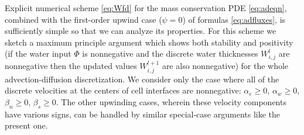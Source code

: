 \documentclass[11pt,final]{amsart}%
\newcommand{\Wlij}{W^l_{i,j}}
\begin{document}
Explicit numerical scheme \eqref{eq:Wfd} for the mass conservation PDE \eqref{eq:adeqn}, combined with the first-order upwind case ($\psi=0$) of formulas \eqref{eq:adfluxes}, is sufficiently simple so that we can analyze its properties.  For this scheme we sketch a maximum principle argument \citep{MortonMayers} which shows both stability and positivity (if the water input $\Phi$ is nonnegative and the discrete water thicknesses $\Wlij$ are nonnegative then the updated values $W_{i,j}^{l+1}$ are also nonnegative) for the whole advection-diffusion discretization.    We consider only the case where all of the discrete velocities at the centers of cell interfaces are nonnegative: $\alpha_e\ge 0$, $\alpha_w\ge 0$, $\beta_n\ge 0$, $\beta_s\ge 0$.  The other upwinding cases, wherein these velocity components have various signs, can be handled by similar special-case arguments like the present one.
\end{document}
